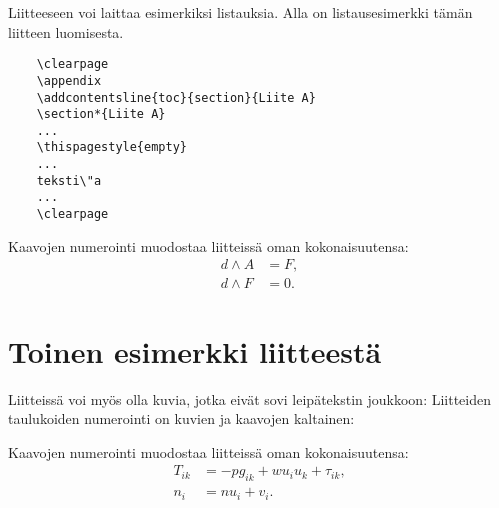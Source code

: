 \documentclass[english, 12pt, a4paper, elec, utf8, a-1b, online]{aaltothesis}
\begin{document}
Liitteeseen voi laittaa esimerkiksi listauksia. Alla on 
listausesimerkki t\"am\"an liitteen luomisesta. 

\begin{verbatim}
	\clearpage
	\appendix
	\addcontentsline{toc}{section}{Liite A}
	\section*{Liite A}
	...
	\thispagestyle{empty}
	...
	teksti\"a
	...
	\clearpage
\end{verbatim}

Kaavojen numerointi muodostaa liitteiss\"a oman kokonaisuutensa:
\begin{align}
d \wedge A &= F, \label{liitekaava1}\\
d \wedge F &= 0. \label{liitekaava2}
\end{align}


\clearpage
\section{Toinen esimerkki liitteest\"a\label{LiiteB}}


Liitteiss\"a voi my\"os olla kuvia, jotka
eiv\"at sovi leip\"atekstin joukkoon:
Liitteiden taulukoiden numerointi on kuvien ja kaavojen kaltainen:
\begin{table}[htb]
\caption{Taulukon kuvateksti.}
\label{liitetaulukko}
\begin{center}
\end{center}
\end{table}
Kaavojen numerointi muodostaa liitteiss\"a oman kokonaisuutensa:
\begin{align}
T_{ik} &= -p g_{ik} + w u_i u_k + \tau_{ik},  \label{liitekaava3} \\
n_i    &= n u_i + v_i.                      \label{liitekaava4}
\end{align}
\end{document}
